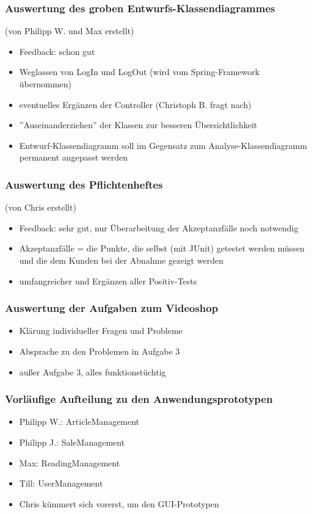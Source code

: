 \documentclass[12pt,a4paper]{article}
\begin{document}
\subsubsection*{Auswertung des groben Entwurfs-Klassendiagrammes}
(von Philipp W. und Max erstellt)
\begin{itemize}
\item Feedback: schon gut
\item Weglassen von LogIn und LogOut (wird vom Spring-Framework übernommen)
\item eventuelles Ergänzen der Controller (Christoph B. fragt nach)
\item ''Auseinanderziehen'' der Klassen zur besseren Übersichtlichkeit
\item Entwurf-Klassendiagramm soll im Gegensatz zum Analyse-Klassendiagramm permanent angepasst werden
\end{itemize}

\subsubsection*{Auswertung des Pflichtenheftes}
(von Chris erstellt)
\begin{itemize}
\item Feedback: sehr gut, nur Überarbeitung der Akzeptanzfälle noch notwendig
\item Akzeptanzfälle = die Punkte, die selbst (mit JUnit) getestet werden müssen und die dem Kunden bei der Abnahme gezeigt werden
\item umfangreicher und Ergänzen aller Positiv-Tests
\end{itemize}

\subsubsection*{Auswertung der Aufgaben zum Videoshop}
\begin{itemize}
\item Klärung individueller Fragen und Probleme
\item Absprache zu den Problemen in Aufgabe 3
\item außer Aufgabe 3, alles funktionstüchtig
\end{itemize}

\subsubsection*{Vorläufige Aufteilung zu den Anwendungsprototypen}
\begin{itemize}
\item Philipp W.: ArticleManagement
\item Philipp J.: SaleManagement
\item Max: ReadingManagement
\item Till: UserManagement
\item Chris kümmert sich vorerst, um den GUI-Prototypen
\end{itemize}
\end{document}
